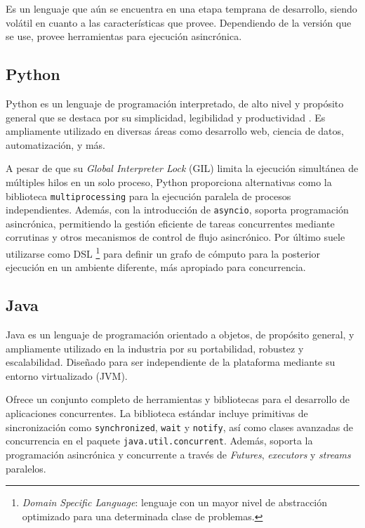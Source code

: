 \documentclass[11pt]{article}
\let\Oldsubsection\subsection
\renewcommand{\subsection}{\FloatBarrier\Oldsubsection}
\newcommand{\english}[1]{\textit{#1}}
\begin{document}
Es un lenguaje que aún se encuentra en una etapa temprana de desarrollo, siendo volátil en cuanto a las características que provee. Dependiendo de la versión que se use, provee herramientas para ejecución asincrónica.

\subsection{Python}

Python es un lenguaje de programación interpretado, de alto nivel y propósito general que se destaca por su simplicidad, legibilidad y productividad \cite{com:python}. Es ampliamente utilizado en diversas áreas como desarrollo web, ciencia de datos, automatización, y más.

A pesar de que su \english{Global Interpreter Lock} (GIL) limita la ejecución simultánea de múltiples hilos en un solo proceso, Python proporciona alternativas como la biblioteca \lstinline{multiprocessing} para la ejecución paralela de procesos independientes. Además, con la introducción de \lstinline{asyncio}, soporta programación asincrónica, permitiendo la gestión eficiente de tareas concurrentes mediante corrutinas y otros mecanismos de control de flujo asincrónico. Por último suele utilizarse como DSL \footnote{\english{Domain Specific Language}: lenguaje con un mayor nivel de abstracción optimizado para una determinada clase de problemas.} para definir un grafo de cómputo para la posterior ejecución en un ambiente diferente, más apropiado para concurrencia.

\subsection{Java}

Java es un lenguaje de programación orientado a objetos, de propósito general, y ampliamente utilizado en la industria por su portabilidad, robustez y escalabilidad. Diseñado para ser independiente de la plataforma mediante su entorno virtualizado (JVM).

Ofrece un conjunto completo de herramientas y bibliotecas para el desarrollo de aplicaciones concurrentes. La biblioteca estándar incluye primitivas de sincronización como \lstinline{synchronized}, \lstinline{wait} y \lstinline{notify}, así como clases avanzadas de concurrencia en el paquete \lstinline{java.util.concurrent}. Además, soporta la programación asincrónica y concurrente a través de \english{Futures}, \english{executors} y \english{streams} paralelos.
\end{document}
